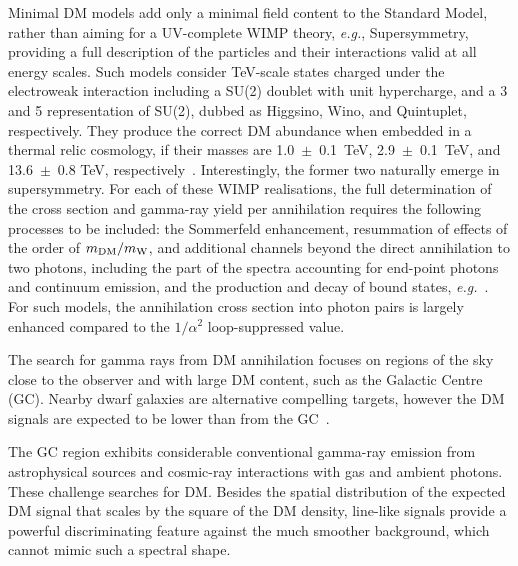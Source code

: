 \documentclass[aps,prl,twocolumn,floats,balancelastpage,showpacs,showkeys,preprintnumbers,floatfix,nofootinbib,superscriptaddress, longbibliography]{revtex4-1}
\begin{document}
Minimal DM models add only a minimal field content to the Standard Model, rather than aiming for a UV-complete WIMP theory, \textit{e.g.}, Supersymmetry, providing a full description of the particles and their interactions valid at all energy scales. Such models consider TeV-scale states charged under the electroweak interaction including a SU(2) doublet with unit hypercharge, and a 3 and 5 representation of SU(2), dubbed as Higgsino, Wino, and Quintuplet, respectively. They produce the correct DM abundance when embedded in a thermal relic cosmology, if their masses are 1.0~$\pm$~0.1~TeV, 2.9~$\pm$~0.1~TeV, and 13.6~$\pm$~0.8 TeV, respectively~\cite{Cirelli:2007xd,Hisano:2006nn,Hryczuk:2010zi,Beneke:2016ync,Mitridate:2017izz,Bottaro:2021snn}. Interestingly, the former two naturally emerge in supersymmetry. For each of these WIMP realisations, the full determination of the cross section and gamma-ray yield per annihilation requires the following processes to be included: the Sommerfeld enhancement, resummation of effects of the order of $m_{\rm DM}/m_{\rm W}$, and additional channels beyond the direct annihilation to two photons, including the part of the spectra accounting for end-point photons and continuum emission, and the production and decay of bound states, \textit{e.g.}~\cite{Baumgart:2014vma,Baumgart:2015bpa,Baumgart:2018yed,Beneke:2018ssm,Beneke:2019gtg,Beneke:2019vhz,Rinchiuso:2020skh,Beneke:2022eci,Baumgart:2023pwn}. For such models, the annihilation cross section into photon pairs is largely enhanced compared to the $1/\alpha^2$ loop-suppressed value.


The search for gamma rays from DM annihilation focuses on regions of the sky close to the observer and with large DM content, such as the Galactic Centre (GC). Nearby dwarf galaxies are alternative compelling targets, however the DM signals are expected to be lower than from the GC~\cite{Strigari:2018utn}.

The GC region exhibits considerable conventional gamma-ray emission from astrophysical sources and cosmic-ray interactions with gas and ambient photons. These challenge searches for DM. Besides the spatial distribution of the expected DM signal that scales by the square of the DM density, line-like signals provide a powerful discriminating feature against the much smoother background, which cannot mimic such a spectral shape.
\end{document}
